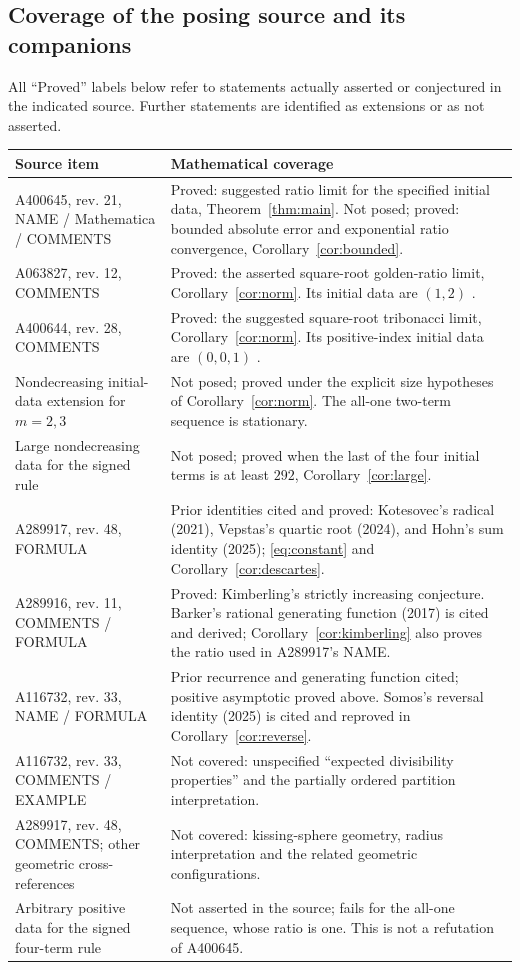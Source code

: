 \documentclass[11pt]{article}
\begin{document}
\subsection*{Coverage of the posing source and its companions}
All ``Proved'' labels below refer to statements actually asserted or
conjectured in the indicated source. Further statements are identified
as extensions or as not asserted.
{\small
\begin{longtable}{@{}p{.29\linewidth}p{.65\linewidth}@{}}
\toprule
Source item & Mathematical coverage\\\midrule
A400645, rev. 21, NAME / Mathematica / COMMENTS &
Proved: suggested ratio limit for the specified initial data,
Theorem~\ref{thm:main}. Not posed; proved: bounded absolute error and
exponential ratio convergence, Corollary~\ref{cor:bounded}.\\
A063827, rev. 12, COMMENTS &
Proved: the asserted square-root golden-ratio limit,
Corollary~\ref{cor:norm}. Its initial data are $(1,2)$ \cite{two}.\\
A400644, rev. 28, COMMENTS &
Proved: the suggested square-root tribonacci limit,
Corollary~\ref{cor:norm}. Its positive-index initial data are $(0,0,1)$
\cite{three}.\\
Nondecreasing initial-data extension for $m=2,3$ &
Not posed; proved under the explicit size hypotheses of
Corollary~\ref{cor:norm}. The all-one two-term sequence is stationary.\\
Large nondecreasing data for the signed rule &
Not posed; proved when the last of the four initial terms is at least
$292$, Corollary~\ref{cor:large}.\\
A289917, rev. 48, FORMULA &
Prior identities cited and proved: Kotesovec's radical (2021),
Vepstas's quartic root (2024), and Hohn's sum identity (2025);
\eqref{eq:constant} and Corollary~\ref{cor:descartes}.\\
A289916, rev. 11, COMMENTS / FORMULA &
Proved: Kimberling's strictly increasing conjecture.
Barker's rational generating function (2017) is cited and derived;
Corollary~\ref{cor:kimberling} also proves the ratio used in
A289917's NAME.\\
A116732, rev. 33, NAME / FORMULA &
Prior recurrence and generating function cited; positive asymptotic
proved above. Somos's reversal identity (2025) is cited and reproved
in Corollary~\ref{cor:reverse}.\\
A116732, rev. 33, COMMENTS / EXAMPLE &
Not covered: unspecified ``expected divisibility properties'' and
the partially ordered partition interpretation.\\
A289917, rev. 48, COMMENTS; other geometric cross-references &
Not covered: kissing-sphere geometry, radius interpretation and
the related geometric configurations.\\
Arbitrary positive data for the signed four-term rule &
Not asserted in the source; fails for the all-one sequence, whose
ratio is one. This is not a refutation of A400645.\\
\bottomrule
\end{longtable}}
\end{document}
